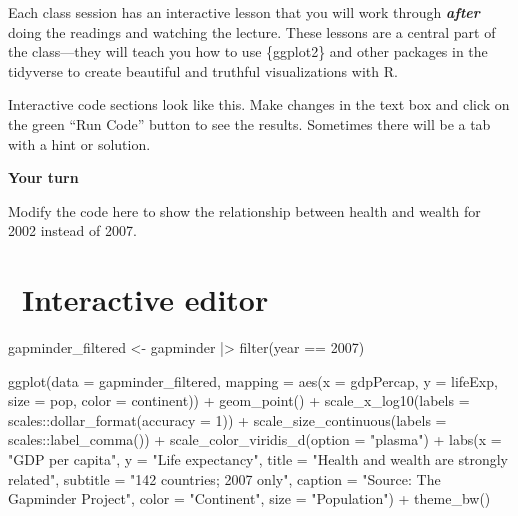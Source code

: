 \documentclass[
  letterpaper,
  DIV=11,
  numbers=noendperiod]{scrreprt}
\newenvironment{Shaded}{\begin{snugshade}}{\end{snugshade}}
\newcommand{\NormalTok}[1]{\textcolor[rgb]{0.00,0.23,0.31}{#1}}
\begin{document}
Each class session has an interactive lesson that you will work through
\textbf{\emph{after}} doing the readings and watching the lecture. These
lessons are a central part of the class---they will teach you how to use
\{ggplot2\} and other packages in the tidyverse to create beautiful and
truthful visualizations with R.

Interactive code sections look like this. Make changes in the text box
and click on the green ``Run Code'' button to see the results. Sometimes
there will be a tab with a hint or solution.

\begin{tcolorbox}[enhanced jigsaw, colframe=quarto-callout-important-color-frame, leftrule=.75mm, breakable, toprule=.15mm, arc=.35mm, rightrule=.15mm, colback=white, opacityback=0, bottomrule=.15mm, left=2mm]
\begin{minipage}[t]{5.5mm}
\textcolor{quarto-callout-important-color}{\faExclamation}
\end{minipage}%
\begin{minipage}[t]{\textwidth - 5.5mm}

\vspace{-3mm}\textbf{Your turn}\vspace{3mm}

Modify the code here to show the relationship between health and wealth
for 2002 instead of 2007.

\section{\texorpdfstring{ Interactive
editor}{ Interactive editor}}

\begin{Shaded}
\begin{Highlighting}[]
\NormalTok{gapminder\_filtered \textless{}{-} gapminder |\textgreater{}}
\NormalTok{  filter(year == 2007)}

\NormalTok{ggplot(data = gapminder\_filtered,}
\NormalTok{       mapping = aes(x = gdpPercap, y = lifeExp, }
\NormalTok{                     size = pop, color = continent)) +}
\NormalTok{  geom\_point() + }
\NormalTok{  scale\_x\_log10(labels = scales::dollar\_format(accuracy = 1)) +}
\NormalTok{  scale\_size\_continuous(labels = scales::label\_comma()) +}
\NormalTok{  scale\_color\_viridis\_d(option = "plasma") +}
\NormalTok{  labs(x = "GDP per capita", y = "Life expectancy",}
\NormalTok{       title = "Health and wealth are strongly related",}
\NormalTok{       subtitle = "142 countries; 2007 only", caption = "Source: The Gapminder Project",}
\NormalTok{       color = "Continent", size = "Population") +}
\NormalTok{  theme\_bw()}
\end{Highlighting}
\end{Shaded}


\end{minipage}
\end{tcolorbox}
\end{document}
